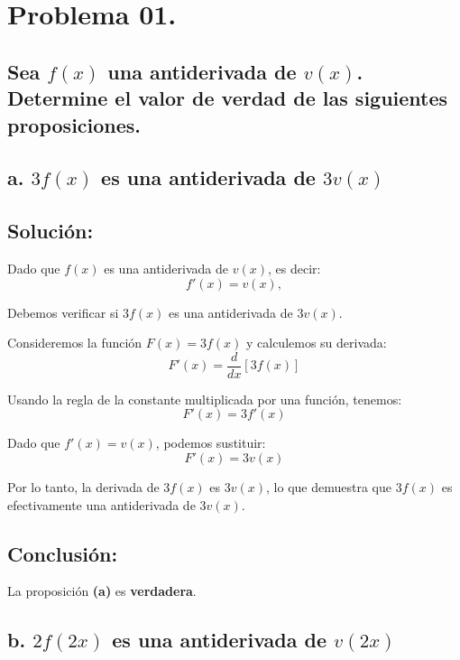 \documentclass{article}
\begin{document}
\large %

\section*{Problema 01.}

\subsection*{Sea \(f(x)\) una antiderivada de \(v(x)\). Determine el valor de verdad de las siguientes proposiciones.}

\subsection*{\newline a. \(3f(x)\) es una antiderivada de \(3v(x)\)}
\subsection*{Solución: } 

Dado que \(f(x)\) es una antiderivada de \(v(x)\), es decir:
\[
f'(x) = v(x),
\]

\noindent Debemos verificar si \(3f(x)\) es una antiderivada de \(3v(x)\).

\noindent \newline Consideremos la función \(F(x) = 3f(x)\) y calculemos su derivada:
\[
F'(x) = \frac{d}{dx}[3f(x)]
\]

\noindent \newline Usando la regla de la constante multiplicada por una función, tenemos:
\[
F'(x) = 3f'(x)
\]

\noindent Dado que \(f'(x) = v(x)\), podemos sustituir:
\[
F'(x) = 3v(x)
\]

\noindent Por lo tanto, la derivada de \(3f(x)\) es \(3v(x)\), lo que demuestra que \(3f(x)\) es efectivamente una antiderivada de \(3v(x)\).

\subsection*{Conclusión:}

La proposición \textbf{(a)} es \textbf{verdadera}.


\subsection*{\newline b. \(2f(2x)\) es una antiderivada de \(v(2x)\)}
\end{document}
